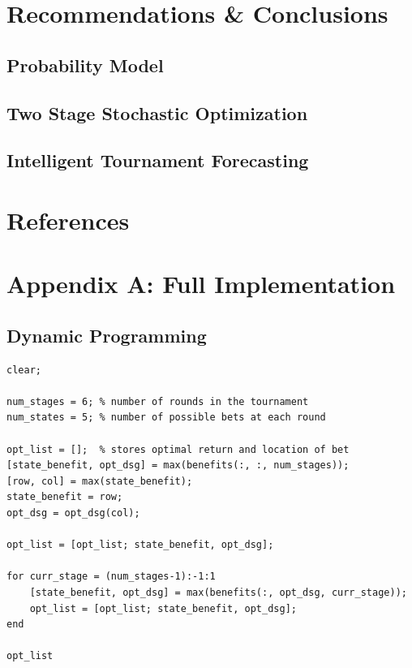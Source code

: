 \documentclass[12pt]{article}
\begin{document}
\newpage
\section{Recommendations \& Conclusions}
\subsection{Probability Model}

\subsection{Two Stage Stochastic Optimization}

\subsection{Intelligent Tournament Forecasting}

\newpage
\section{References}



\newpage
\section{Appendix A: Full Implementation}
\subsection{Dynamic Programming}
\begin{verbatim}
clear;

num_stages = 6;	% number of rounds in the tournament
num_states = 5;	% number of possible bets at each round

opt_list = [];	% stores optimal return and location of bet
[state_benefit, opt_dsg] = max(benefits(:, :, num_stages));
[row, col] = max(state_benefit);
state_benefit = row;
opt_dsg = opt_dsg(col);

opt_list = [opt_list; state_benefit, opt_dsg];

for curr_stage = (num_stages-1):-1:1
	[state_benefit, opt_dsg] = max(benefits(:, opt_dsg, curr_stage));
	opt_list = [opt_list; state_benefit, opt_dsg];
end

opt_list
\end{verbatim}

\begingroup
    \fontsize{8pt}{10pt}
    \lstset{breaklines=true}
	
\end{document}

